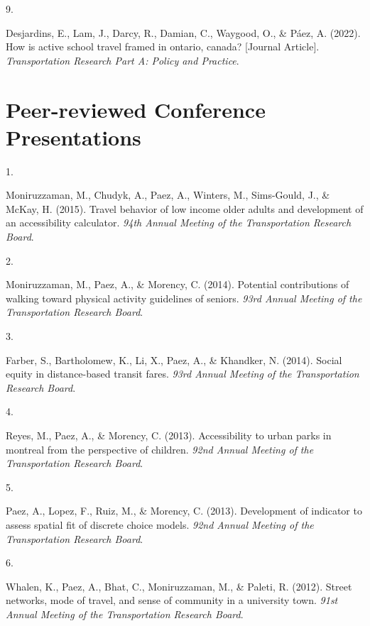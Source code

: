 \documentclass[10pt,a4paper,]{twentysecondcv}
\newlength{\csllabelwidth}
\newcommand{\CSLLeftMargin}[1]{\parbox[t]{\csllabelwidth}{#1}}
\newcommand{\CSLRightInline}[1]{\parbox[t]{\linewidth - \csllabelwidth}{#1}}
\begin{document}
\leavevmode{}%
\CSLLeftMargin{9. }%
\CSLRightInline{Desjardins, E., Lam, J., Darcy, R., Damian, C., Waygood,
O., \& Páez, A. (2022). How is active school travel framed in ontario,
canada? {[}Journal Article{]}. \emph{Transportation Research Part A:
Policy and Practice}.}

\hypertarget{peer-reviewed-conference-presentations}{%
\section{Peer-reviewed Conference
Presentations}\label{peer-reviewed-conference-presentations}}

\hypertarget{bibliography}{}
\leavevmode{}%
\CSLLeftMargin{1. }%
\CSLRightInline{Moniruzzaman, M., Chudyk, A., Paez, A., Winters, M.,
Sims-Gould, J., \& McKay, H. (2015). Travel behavior of low income older
adults and development of an accessibility calculator. \emph{94th Annual
Meeting of the Transportation Research Board}.}

\leavevmode{}%
\CSLLeftMargin{2. }%
\CSLRightInline{Moniruzzaman, M., Paez, A., \& Morency, C. (2014).
Potential contributions of walking toward physical activity guidelines
of seniors. \emph{93rd Annual Meeting of the Transportation Research
Board}.}

\leavevmode{}%
\CSLLeftMargin{3. }%
\CSLRightInline{Farber, S., Bartholomew, K., Li, X., Paez, A., \&
Khandker, N. (2014). Social equity in distance-based transit fares.
\emph{93rd Annual Meeting of the Transportation Research Board}.}

\leavevmode{}%
\CSLLeftMargin{4. }%
\CSLRightInline{Reyes, M., Paez, A., \& Morency, C. (2013).
Accessibility to urban parks in montreal from the perspective of
children. \emph{92nd Annual Meeting of the Transportation Research
Board}.}

\leavevmode{}%
\CSLLeftMargin{5. }%
\CSLRightInline{Paez, A., Lopez, F., Ruiz, M., \& Morency, C. (2013).
Development of indicator to assess spatial fit of discrete choice
models. \emph{92nd Annual Meeting of the Transportation Research
Board}.}

\leavevmode{}%
\CSLLeftMargin{6. }%
\CSLRightInline{Whalen, K., Paez, A., Bhat, C., Moniruzzaman, M., \&
Paleti, R. (2012). Street networks, mode of travel, and sense of
community in a university town. \emph{91st Annual Meeting of the
Transportation Research Board}.}
\end{document}
